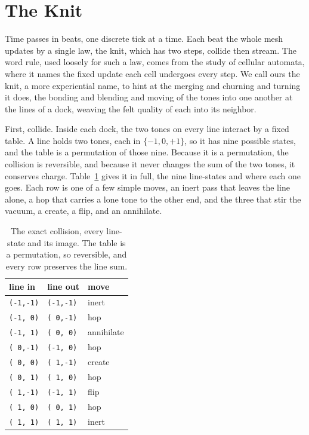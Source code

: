 \section{The Knit}

Time passes in beats, one discrete tick at a time. Each beat the whole mesh updates by a single law, the knit, which has two steps, collide then stream. The word rule, used loosely for such a law, comes from the study of cellular automata, where it names the fixed update each cell undergoes every step. We call ours the knit, a more experiential name, to hint at the merging and churning and turning it does, the bonding and blending and moving of the tones into one another at the lines of a dock, weaving the felt quality of each into its neighbor.

First, collide. Inside each dock, the two tones on every line interact by a fixed table. A line holds two tones, each in $\{-1, 0, +1\}$, so it has nine possible states, and the table is a permutation of those nine. Because it is a permutation, the collision is reversible, and because it never changes the sum of the two tones, it conserves charge. Table~\ref{tab:collision} gives it in full, the nine line-states and where each one goes. Each row is one of a few simple moves, an inert pass that leaves the line alone, a hop that carries a lone tone to the other end, and the three that stir the vacuum, a create, a flip, and an annihilate.

\begin{table}[ht]
\centering
\begin{tabular}{@{}lll@{}}
\toprule
line in & line out & move \\
\midrule
\texttt{(-1,-1)} & \texttt{(-1,-1)} & inert \\
\texttt{(-1,~0)} & \texttt{(~0,-1)} & hop \\
\texttt{(-1,~1)} & \texttt{(~0,~0)} & annihilate \\
\texttt{(~0,-1)} & \texttt{(-1,~0)} & hop \\
\texttt{(~0,~0)} & \texttt{(~1,-1)} & create \\
\texttt{(~0,~1)} & \texttt{(~1,~0)} & hop \\
\texttt{(~1,-1)} & \texttt{(-1,~1)} & flip \\
\texttt{(~1,~0)} & \texttt{(~0,~1)} & hop \\
\texttt{(~1,~1)} & \texttt{(~1,~1)} & inert \\
\bottomrule
\end{tabular}
\caption{The exact collision, every line-state and its image. The table is a permutation, so reversible, and every row preserves the line sum.}
\label{tab:collision}
\end{table}

